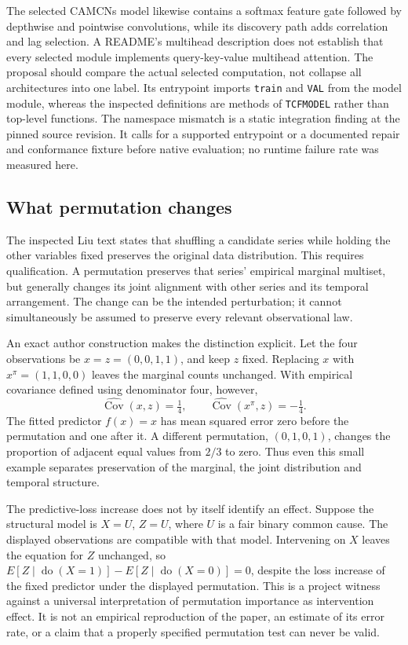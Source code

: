 The selected CAMCNs model likewise contains a softmax feature gate followed by depthwise and
pointwise convolutions, while its discovery path adds correlation and lag selection. A README's
multihead description does not establish that every selected module implements query-key-value
multihead attention. The proposal should compare the actual selected computation, not collapse
all architectures into one label. Its entrypoint imports \texttt{train} and \texttt{VAL} from the
model module, whereas the inspected definitions are methods of \texttt{TCFMODEL} rather than
top-level functions. The namespace mismatch is a static integration finding at the pinned
source revision. It calls for a supported entrypoint or a documented repair and conformance
fixture before native evaluation; no runtime failure rate was measured here.
\citep{exec28_at_camcns}

\subsection{What permutation changes}
The inspected Liu text states that shuffling a candidate series while holding the other variables
fixed preserves the original data distribution. This requires qualification. A permutation
preserves that series' empirical marginal multiset, but generally changes its joint alignment
with other series and its temporal arrangement. The change can be the intended perturbation;
it cannot simultaneously be assumed to preserve every relevant observational law.
\citep{exec28_at_liu}

An exact author construction makes the distinction explicit. Let the four observations be
$x=z=(0,0,1,1)$, and keep $z$ fixed. Replacing $x$ with
$x^\pi=(1,1,0,0)$ leaves the marginal counts unchanged. With empirical covariance defined using
denominator four, however,
\[
 \widehat{\operatorname{Cov}}(x,z)=\tfrac14,
 \qquad \widehat{\operatorname{Cov}}(x^\pi,z)=-\tfrac14.
\]
The fitted predictor $f(x)=x$ has mean squared error zero before the permutation and one
after it. A different permutation, $(0,1,0,1)$, changes the proportion of adjacent equal values
from $2/3$ to zero. Thus even this small example separates preservation of the marginal,
the joint distribution and temporal structure.~\citep{exec28_at_reference}

The predictive-loss increase does not by itself identify an effect. Suppose the structural model
is $X=U$, $Z=U$, where $U$ is a fair binary common cause. The displayed observations are compatible
with that model. Intervening on $X$ leaves the equation for $Z$ unchanged, so
$E[Z\mid\operatorname{do}(X=1)]-E[Z\mid\operatorname{do}(X=0)]=0$, despite the loss increase of
the fixed predictor under the displayed permutation. This is a project witness against a
universal interpretation of permutation importance as intervention effect. It is not an
empirical reproduction of the paper, an estimate of its error rate, or a claim that a properly
specified permutation test can never be valid.~\citep{exec28_at_reference}

